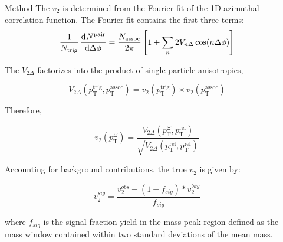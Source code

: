 \documentclass[final]{beamer}
\newlength{\onecolwid}
\newlength{\twocolwid}
\begin{document}
\begin{frame}[t]
\begin{columns}[t]
\begin{column}{\twocolwid}
\begin{columns}[t,totalwidth=\twocolwid]
\begin{column}{\onecolwid}
\begin{block}{Method}
The $ v_{2} $ is determined from the Fourier fit of the 1D azimuthal correlation
function. The Fourier fit contains the first three terms:\vspace{0.5in}
\begin{equation}
\frac{1}{N_{\mathrm{trig}}}\dod{N^{\mathrm{pair}}}{\Delta\phi} =
\frac{N_{\mathrm{assoc}}}{2\pi}\left[ 1 +
\sum_{n}^{}2V_{n\Delta}\cos(n\Delta\phi) \right]
\end{equation}\vspace{0.3in}

The $ V_{2\Delta} $ factorizes into the product of single-particle anisotropies,

\begin{equation}
V_{2\Delta}(p_{\mathrm{T}}^{\mathrm{trig}},p_{\mathrm{T}}^{\mathrm{assoc}}) =
v_{2}(p_{\mathrm{T}}^{\mathrm{trig}})\times
v_{2}(p_{\mathrm{T}}^{\mathrm{assoc}})
\end{equation}

Therefore,

\begin{equation}
v_{2}(p_{\mathrm{T}}^{\Xi}) =
\frac{V_{2\Delta}(p_{\mathrm{T}}^{\Xi},p_{\mathrm{T}}^{\mathrm{ref}})}{\sqrt{V_{2\Delta}(p_{\mathrm{T}}^{\mathrm{ref}},p_{\mathrm{T}}^{\mathrm{ref}})}}
\end{equation}

Accounting for background contributions, the true $ v_{2} $ is given by:

\begin{equation}
v_{2}^{sig} = \frac{v_{2}^{obs} - (1 - f_{sig})*v_{2}^{bkg}}{f_{sig}}
\end{equation}

where $ f_{sig} $ is the signal fraction yield in the mass peak region defined
as the mass window contained within two standard deviations of the mean mass.
\end{block}


\end{column} %

\begin{column}{\onecolwid} %



\end{column}
\end{columns}
\end{column}
\end{columns}
\end{frame}
\end{document}
